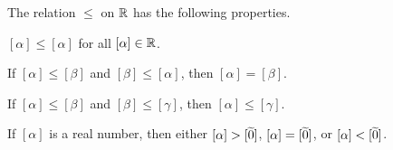 \begin{prop}
The relation \(\leq\) on \(\mathbb{R}\) has the following properties.
\begin{proplist}
\item \([\alpha] \leq [\alpha]\) for all \([\alpha] \in \mathbb{R}\).
\item If \([\alpha] \leq [\beta]\) and \([\beta] \leq [\alpha]\), then \([\alpha] = [\beta]\).
\item If \([\alpha] \leq [\beta]\) and \([\beta] \leq [\gamma]\), then \([\alpha] \leq [\gamma]\).
\item If \([\alpha]\) is a real number, then either \([\alpha] > [\widetilde{0}]\), \([\alpha] = [\widetilde{0}]\), or \([\alpha] < [\widetilde{0}]\).
\end{proplist}
\end{prop}

